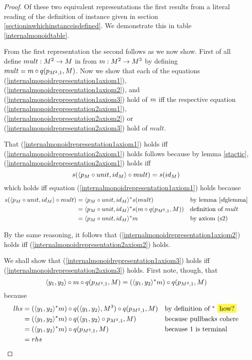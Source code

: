 \begin{proof}
Of these two equivalent representations the first results from a literal reading of the definition of instance 
given in section \ref{sectioninwhichinstanceisdefined}. We demonstrate this in table \ref{internalmonoidtable}. 

From the first representation the second follows as we now show.
First of all define $mult: M^2 \rightarrow M$ in \catcw from $m: M^2 \rightarrow M^3$ by defining
$mult = m \circ q(p_{M^2,1} , M)$. Now we show that each of the equations (\ref{internalmonoidrepresentation1axiom1}),
(\ref{internalmonoidrepresentation1axiom2}), and (\ref{internalmonoidrepresentation1axiom3}) hold of $m$ iff
the respective equation (\ref{internalmonoidrepresentation2axiom1}),
(\ref{internalmonoidrepresentation2axiom2}) or (\ref{internalmonoidrepresentation2axiom3}) hold of $mult$.

That (\ref{internalmonoidrepresentation1axiom1}) holds iff (\ref{internalmonoidrepresentation2axiom1}) holds follows
because by lemma \ref{stactic}, (\ref{internalmonoidrepresentation2axiom1}) holds iff
\begin{equation}
\label{equivalenceone}
s(\langle p_M \circ unit,id_M\rangle \circ mult) = s(id_M)
\end{equation}
which holds iff equation (\ref{internalmonoidrepresentation1axiom1}) holds because 
\begin{align*}
s(\langle p_M \circ unit,id_M\rangle\circ mult) &= \langle p_M \circ unit,id_M\rangle ^* s(mult )  && \mbox{by lemma \ref{sfglemma}} \\
             &= \langle p_M \circ unit,id_M\rangle ^* s(m \circ q(p_{M^2,1} , M)) && \mbox{definition of $mult$} \\
			       &= \langle p_M \circ unit,id_M\rangle ^* m                                &&  \mbox{by axiom (s2)}
\end{align*}

\noindent By the same reasoning, it follows that (\ref{internalmonoidrepresentation1axiom2}) holds iff (\ref{internalmonoidrepresentation2axiom2}) holds.

We shall show that (\ref{internalmonoidrepresentation1axiom3}) holds iff (\ref{internalmonoidrepresentation2axiom3}) holds.
First note, though, that
\begin{equation}
\label{thirdaxiomsubgoal}
 \langle y_1,y_2\rangle\circ m \circ q(p_{M^2,1} , M) = (\langle y_1,y_2\rangle^*m)\circ q(p_{M^3,1},M)
\end{equation}
because
\begin{align*}
lhs &= (\tuple{y_1,y_2}^*\fmult) \circ q(\tuple{y_1,y_2},M^3) \circ q(p_{M^2,1},M)  && \mbox{by definition of $^*$ \highlight{how?}} \\
    &= (\tuple{y_1,y_2}^*\fmult) \circ q(\tuple{y_1,y_2} \circ p_{M^2,1},M)         && \mbox{because pullbacks cohere} \\
    &= (\tuple{y_1,y_2}^*\fmult) \circ q(p_{M^3,1},M)                               && \mbox{because $1$ is terminal }\\
    &= rhs
\end{align*}


\end{proof}
